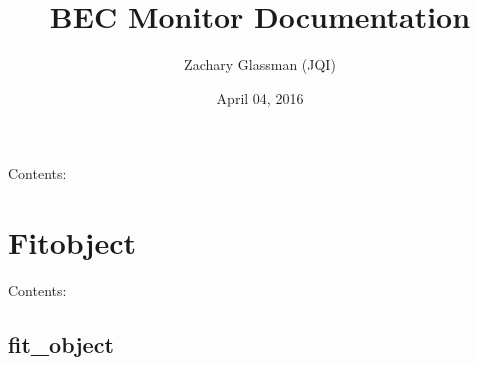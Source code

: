 \documentclass[letterpaper,10pt,english]{sphinxmanual}
\title{BEC Monitor Documentation}
\date{April 04, 2016}
\author{Zachary Glassman (JQI)}
\begin{document}
\maketitle
\tableofcontents
{}\label{index::doc}


Contents:


\chapter{Fitobject}
\label{Fitobject:welcome-to-bec-monitor-s-documentation}\label{Fitobject:fitobject}\label{Fitobject::doc}
Contents:


\section{fit\_object}
\label{fit_object:fit-object}\label{fit_object::doc}
\end{document}
